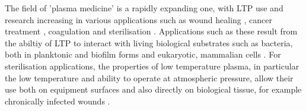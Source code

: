 \documentclass[11pt, oneside]{article}   	%
\newcommand{\todo}[1]{ \textcolor{red}{\bf{To Do:} #1}}
\begin{document}
The field of 'plasma medicine' is a rapidly expanding one, with LTP use and research increasing in various applications such as wound healing \cite{Haertel2014nonthermal, Isbary2013nonthermal}, cancer treatment \cite{Hirst2016low, Fridman2007floating}, coagulation \cite{Fridman2006blood, Chen2009blood} and sterilisation \cite{Fridman2006blood, Laroussi2002nonthermal}.
Applications such as these result from the abiltiy of LTP to interact with living biological substrates such as bacteria, both in planktonic and biofilm forms \cite{Joshi2010control, Pei2012inactivation, Ziuzina2015cold} and eukaryotic, mammalian cells \cite{Haertel2014nonthermal}.
For sterilisation applications, the properties of low temperature plasma, in particular the low temperature and ability to operate at atmospheric pressure, allow their use both on equipment surfaces \cite{Laroussi2002nonthermal} and also directly on biological tissue, for example chronically infected wounds \cite{Haertel2014nonthermal, Isbary2013nonthermal, Fridman2006blood}.
%
\end{document}
